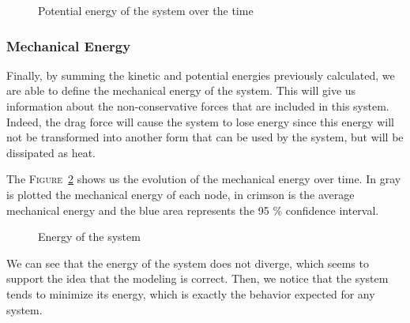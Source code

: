 \begin{figure}
    \centering
    
    \caption{Potential energy of the system over the time}
    \label{fig:potential_energy}
\end{figure}

\subsubsection{Mechanical Energy}

Finally, by summing the kinetic and potential energies previously calculated, we are able to define the mechanical energy of the system. This will give us information about the non-conservative forces that are included in this system. Indeed, the drag force will cause the system to lose energy since this energy will not be transformed into another form that can be used by the system, but will be dissipated as heat.

The \textsc{Figure}~\ref{fig:energy} shows us the evolution of the mechanical energy over time. In gray is plotted the mechanical energy of each node, in crimson is the average mechanical energy and the blue area represents the 95 \% confidence interval.

\begin{figure}
    \centering
    
    \caption{Energy of the system}
    \label{fig:energy}
\end{figure}

We can see that the energy of the system does not diverge, which seems to support the idea that the modeling is correct. Then, we notice that the system tends to minimize its energy, which is exactly the behavior expected for any system.